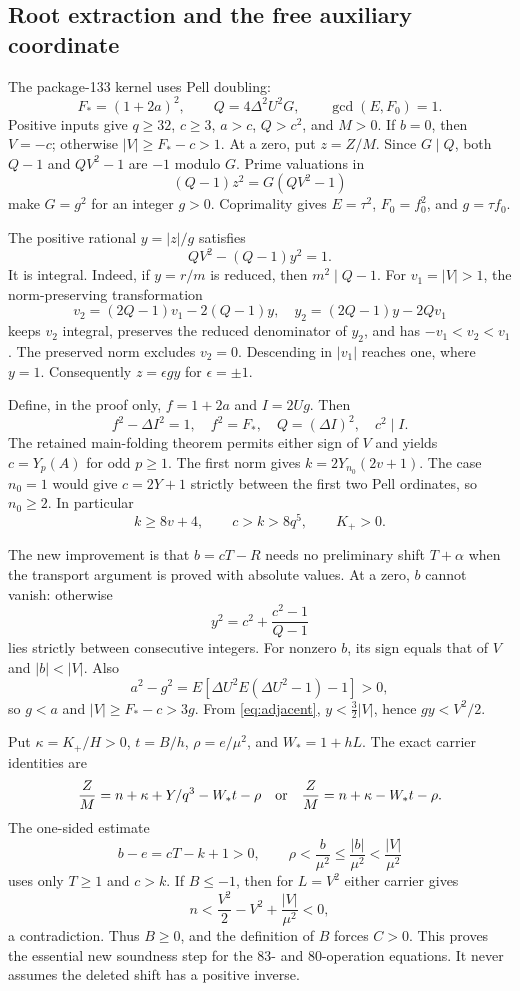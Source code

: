 \subsection{Root extraction and the free auxiliary coordinate}

The package-133 kernel uses Pell doubling:
\[
 F_*=(1+2a)^2,\qquad Q=4\Delta^2U^2G,\qquad\gcd(E,F_0)=1.
\]
Positive inputs give $q\ge32$, $c\ge3$, $a>c$, $Q>c^2$, and $M>0$.
If $b=0$, then $V=-c$; otherwise $|V|\ge F_*-c>1$. At a zero, put
$z=Z/M$. Since $G\mid Q$, both $Q-1$ and $QV^2-1$ are $-1$ modulo $G$.
Prime valuations in
\[
 (Q-1)z^2=G(QV^2-1)
\]
make $G=g^2$ for an integer $g>0$. Coprimality gives
$E=\tau^2$, $F_0=f_0^2$, and $g=\tau f_0$.

The positive rational $y=|z|/g$ satisfies
\begin{equation}\label{eq:adjacent}
 QV^2-(Q-1)y^2=1.
\end{equation}
It is integral. Indeed, if $y=r/m$ is reduced, then $m^2\mid Q-1$.
For $v_1=|V|>1$, the norm-preserving transformation
\[
 v_2=(2Q-1)v_1-2(Q-1)y,\quad y_2=(2Q-1)y-2Qv_1
\]
keeps $v_2$ integral, preserves the reduced denominator of $y_2$, and
has $-v_1<v_2<v_1$. The preserved norm excludes $v_2=0$. Descending in $|v_1|$ reaches one, where $y=1$.
Consequently $z=\epsilon gy$ for $\epsilon=\pm1$.

Define, in the proof only, $f=1+2a$ and $I=2Ug$. Then
\[
 f^2-\Delta I^2=1,\quad f^2=F_*,\quad Q=(\Delta I)^2,
 \quad c^2\mid I.
\]
The retained main-folding theorem permits either sign of $V$ and yields
$c=Y_p(A)$ for odd $p\ge1$. The first norm gives
$k=2Y_{n_0}(2v+1)$. The case $n_0=1$ would give $c=2Y+1$ strictly
between the first two Pell ordinates, so $n_0\ge2$. In particular
\[
 k\ge8v+4,\qquad c>k>8q^5,\qquad K_+>0.
\]

The new improvement is that $b=cT-R$ needs no preliminary shift
$T+\alpha$ when the transport argument is proved with absolute values.
At a zero, $b$ cannot vanish: otherwise
\[
 y^2=c^2+\frac{c^2-1}{Q-1}
\]
lies strictly between consecutive integers. For nonzero $b$, its sign
equals that of $V$ and $|b|<|V|$. Also
\[
 a^2-g^2=E[\Delta U^2E(\Delta U^2-1)-1]>0,
\]
so $g<a$ and $|V|\ge F_*-c>3g$. From \eqref{eq:adjacent},
$y<\tfrac32|V|$, hence $gy<V^2/2$.

Put $\kappa=K_+/H>0$, $t=B/h$, $\rho=e/\mu^2$, and
$W_*=1+hL$. The exact carrier identities are
\[
 \frac ZM=n+\kappa+Y/q^3-W_*t-\rho
 \quad\hbox{or}\quad
 \frac ZM=n+\kappa-W_*t-\rho.
\]
The one-sided estimate
\[
 b-e=cT-k+1>0,\qquad
 \rho<\frac b{\mu^2}\le\frac{|b|}{\mu^2}<\frac{|V|}{\mu^2}
\]
uses only $T\ge1$ and $c>k$. If $B\le-1$, then for $L=V^2$ either
carrier gives
\[
 n<\frac{V^2}{2}-V^2+\frac{|V|}{\mu^2}<0,
\]
a contradiction. Thus $B\ge0$, and the definition of $B$ forces $C>0$.
This proves the essential new soundness step for the 83- and 80-operation
equations. It never assumes the deleted shift has a positive inverse.


